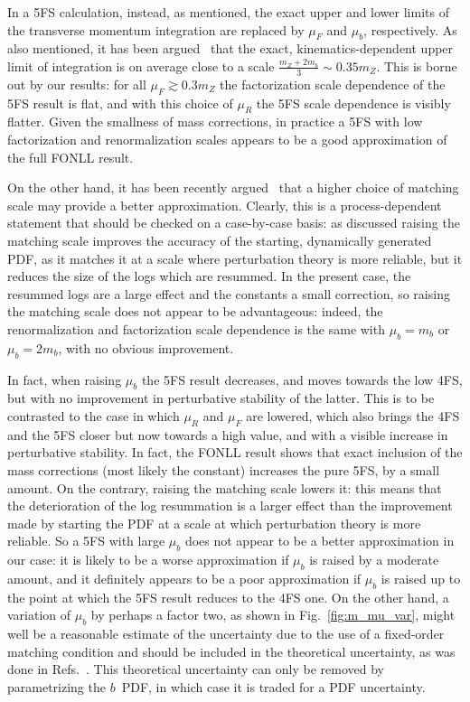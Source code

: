 \documentclass[12pt]{article}
\begin{document}
In a 5FS calculation, instead, as mentioned, the exact upper and lower
limits of the transverse momentum integration are replaced by $\mu_F$
and $\mu_b$, respectively. As also mentioned, it has been
argued~\cite{Maltoni:2012pa,Lim:2016wjo} 
that the exact, kinematics-dependent upper limit of integration is
on average close to a scale $\frac{m_Z+2m_b}{3}\sim 0.35m_Z$. This is
borne out by our results: for all $\mu_F\gtrsim0.3m_Z$ the 
factorization scale dependence of the 5FS result is flat, and with
this choice of $\mu_R$ the 5FS scale dependence is visibly
flatter. Given the smallness of mass
corrections, in practice a 5FS with low factorization and
renormalization scales appears to be a good approximation of the full
FONLL result.

On the other hand, it has been recently argued~\cite{Bertone:2017djs}
that a higher choice of matching scale may provide a better
approximation. Clearly, this is a process-dependent statement that
should be checked on a case-by-case basis: as discussed raising the
matching scale improves the accuracy of the starting, dynamically
generated PDF, as it matches it at a scale where perturbation theory
is more reliable, but it reduces the size of the logs which are
resummed. In the present case, the resummed logs are a large effect
and the constants a small correction, so raising the matching scale
does not appear to be advantageous: indeed, the renormalization and
factorization scale dependence is the same with $\mu_b=m_b$ or
$\mu_b=2m_b$, with no obvious improvement. 


In fact, when raising $\mu_b$
the 5FS result decreases, and moves towards the low 4FS, but with no
improvement in perturbative stability of the latter. This is to be
contrasted to the case in which $\mu_R$ and $\mu_F$ are lowered, which
also brings the 4FS and the 5FS closer but now towards a high value,
and with a visible increase in perturbative stability. In fact, the
FONLL result shows that exact inclusion of the mass corrections (most
likely the constant) increases the pure 5FS, by a small
amount. On the contrary, raising the matching scale lowers it: this
means that the deterioration of the log resummation is a larger effect
than the improvement made by starting the PDF at a scale at which
perturbation theory is more reliable.
So a 5FS with
large $\mu_b$ does not appear to be a better approximation in our case:
it is likely to be a worse approximation if  $\mu_b$ is raised by a
moderate amount,
and it definitely appears to be a poor approximation if $\mu_b$ is
raised up to the point at which the 5FS result reduces to the 4FS
one. On the other hand, a variation of $\mu_b$ by perhaps a factor
two, as shown in Fig.~\ref{fig:m_mu_var}, might well be a reasonable
estimate of the uncertainty due to the use of a fixed-order matching
condition and should be included in the theoretical uncertainty, as was
done in Refs.~\cite{Bonvini:2016fgf,deFlorian:2016spz}. This theoretical
uncertainty can only be removed by parametrizing the $b$~PDF, in which
case it is  traded for a PDF uncertainty.
\end{document}
